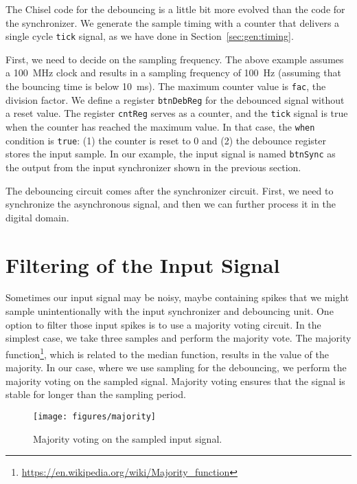 \documentclass[%
    10pt,
    headinclude, footexclude,
    openright, %
    notitlepage,
    cleardoubleempty,
    headsepline,
    pointlessnumbers,
    bibtotoc, idxtotoc,
    ]{scrbook}
\newcommand{\scale}{0.7}
\newcommand{\code}[1]{{\lstinline[basicstyle=\small\ttfamily]{#1}}}
\newcommand{\myref}[2]{\href{#1}{#2}}
\renewcommand{\myref}[2]{{#2}{\footnote{\url{#1}}}}
\begin{document}
The Chisel code for the debouncing is a little bit more evolved than the
code for the synchronizer.
We generate the sample timing with a counter that delivers a single
cycle \code{tick} signal, as we have done in Section~\ref{sec:gen:timing}.


First, we need to decide on the sampling frequency. The above example
assumes a 100~MHz clock and results in a sampling frequency of 100~Hz
(assuming that the bouncing time is below 10~ms). The maximum
counter value is \code{fac}, the division factor.
We define a register \code{btnDebReg} for the debounced signal
without a reset value. The register \code{cntReg} serves
as a counter, and the \code{tick} signal is true when the counter has
reached the maximum value. In that case, the \code{when} condition
is \code{true}: (1) the counter is reset to 0 and (2) the debounce
register stores the input sample. In our example, the input signal is named
\code{btnSync} as the output from the input synchronizer shown
in the previous section.

The debouncing circuit comes after the synchronizer circuit.
First, we need to synchronize the asynchronous signal, and then
we can further process it in the digital domain.

\section{Filtering of the Input Signal}


Sometimes our input signal may be noisy, maybe containing spikes
that we might sample unintentionally with the input synchronizer and
debouncing unit.
One option to filter those input spikes is to use a majority voting
circuit. In the simplest case, we take three samples and perform
the majority vote. The \myref{https://en.wikipedia.org/wiki/Majority_function}{majority function},
which is related to the median function, results in the value of the majority.
In our case, where we use sampling for the debouncing, we perform the
majority voting on the sampled signal.
Majority voting ensures that the signal is stable for longer than the sampling period.

\begin{figure}
  \centering
  \texttt{[image: figures/majority]}
  \caption{Majority voting on the sampled input signal.}
  \label{fig:majority}
\end{figure}
\end{document}
